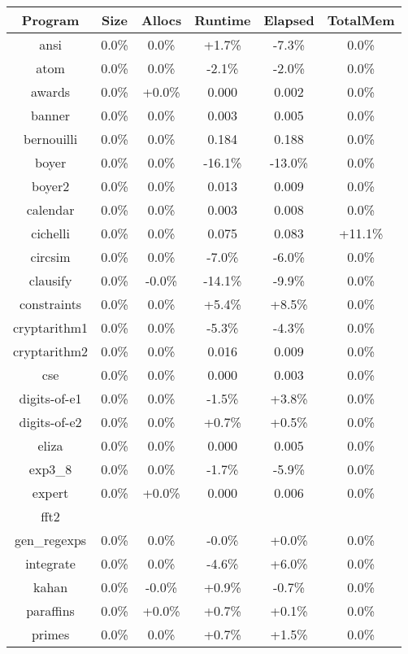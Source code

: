 \begin{tabular}{ c c c c c c }
Program & Size & Allocs & Runtime & Elapsed & TotalMem\\
\hline
ansi &  0.0\% &  0.0\% & +1.7\% & -7.3\% &  0.0\%\\
atom &  0.0\% &  0.0\% & -2.1\% & -2.0\% &  0.0\%\\
awards &  0.0\% & +0.0\% & 0.000 & 0.002 &  0.0\%\\
banner &  0.0\% &  0.0\% & 0.003 & 0.005 &  0.0\%\\
bernouilli &  0.0\% &  0.0\% & 0.184 & 0.188 &  0.0\%\\
boyer &  0.0\% &  0.0\% & -16.1\% & -13.0\% &  0.0\%\\
boyer2 &  0.0\% &  0.0\% & 0.013 & 0.009 &  0.0\%\\
calendar &  0.0\% &  0.0\% & 0.003 & 0.008 &  0.0\%\\
cichelli &  0.0\% &  0.0\% & 0.075 & 0.083 & +11.1\%\\
circsim &  0.0\% &  0.0\% & -7.0\% & -6.0\% &  0.0\%\\
clausify &  0.0\% & -0.0\% & -14.1\% & -9.9\% &  0.0\%\\
constraints &  0.0\% &  0.0\% & +5.4\% & +8.5\% &  0.0\%\\
cryptarithm1 &  0.0\% &  0.0\% & -5.3\% & -4.3\% &  0.0\%\\
cryptarithm2 &  0.0\% &  0.0\% & 0.016 & 0.009 &  0.0\%\\
cse &  0.0\% &  0.0\% & 0.000 & 0.003 &  0.0\%\\
digits-of-e1 &  0.0\% &  0.0\% & -1.5\% & +3.8\% &  0.0\%\\
digits-of-e2 &  0.0\% &  0.0\% & +0.7\% & +0.5\% &  0.0\%\\
eliza &  0.0\% &  0.0\% & 0.000 & 0.005 &  0.0\%\\
exp3\_8 &  0.0\% &  0.0\% & -1.7\% & -5.9\% &  0.0\%\\
expert &  0.0\% & +0.0\% & 0.000 & 0.006 &  0.0\%\\
fft2 &  &  &  &  & \\
gen\_regexps &  0.0\% &  0.0\% & -0.0\% & +0.0\% &  0.0\%\\
integrate &  0.0\% &  0.0\% & -4.6\% & +6.0\% &  0.0\%\\
kahan &  0.0\% & -0.0\% & +0.9\% & -0.7\% &  0.0\%\\
paraffins &  0.0\% & +0.0\% & +0.7\% & +0.1\% &  0.0\%\\
primes &  0.0\% &  0.0\% & +0.7\% & +1.5\% &  0.0\%\\

\end{tabular}
